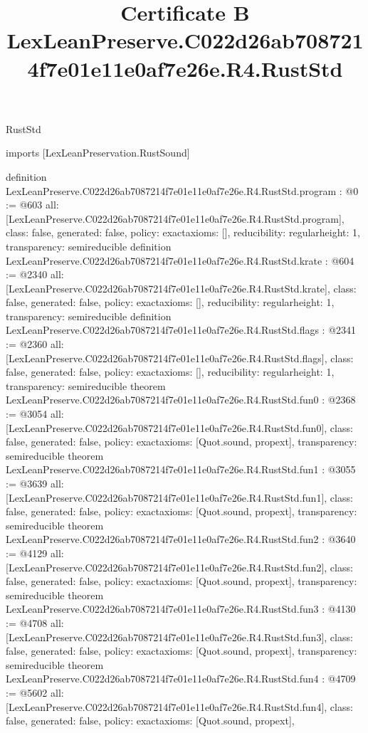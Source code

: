 \begin{lexlean}{RustStd}
\title{Certificate B LexLeanPreserve.C022d26ab7087214f7e01e11e0af7e26e.R4.RustStd}
\begin{coremodule}
imports [LexLeanPreservation.RustSound]

definition LexLeanPreserve.C022d26ab7087214f7e01e11e0af7e26e.R4.RustStd.program : @0 := @603 {
  all: [LexLeanPreserve.C022d26ab7087214f7e01e11e0af7e26e.R4.RustStd.program],
  class: false,
  generated: false,
  policy: exact{axioms: []},
  reducibility: regular{height: 1},
  transparency: semireducible
}
definition LexLeanPreserve.C022d26ab7087214f7e01e11e0af7e26e.R4.RustStd.krate : @604 := @2340 {
  all: [LexLeanPreserve.C022d26ab7087214f7e01e11e0af7e26e.R4.RustStd.krate],
  class: false,
  generated: false,
  policy: exact{axioms: []},
  reducibility: regular{height: 1},
  transparency: semireducible
}
definition LexLeanPreserve.C022d26ab7087214f7e01e11e0af7e26e.R4.RustStd.flags : @2341 := @2360 {
  all: [LexLeanPreserve.C022d26ab7087214f7e01e11e0af7e26e.R4.RustStd.flags],
  class: false,
  generated: false,
  policy: exact{axioms: []},
  reducibility: regular{height: 1},
  transparency: semireducible
}
theorem LexLeanPreserve.C022d26ab7087214f7e01e11e0af7e26e.R4.RustStd.fun0 : @2368 := @3054 {
  all: [LexLeanPreserve.C022d26ab7087214f7e01e11e0af7e26e.R4.RustStd.fun0],
  class: false,
  generated: false,
  policy: exact{axioms: [Quot.sound, propext]},
  transparency: semireducible
}
theorem LexLeanPreserve.C022d26ab7087214f7e01e11e0af7e26e.R4.RustStd.fun1 : @3055 := @3639 {
  all: [LexLeanPreserve.C022d26ab7087214f7e01e11e0af7e26e.R4.RustStd.fun1],
  class: false,
  generated: false,
  policy: exact{axioms: [Quot.sound, propext]},
  transparency: semireducible
}
theorem LexLeanPreserve.C022d26ab7087214f7e01e11e0af7e26e.R4.RustStd.fun2 : @3640 := @4129 {
  all: [LexLeanPreserve.C022d26ab7087214f7e01e11e0af7e26e.R4.RustStd.fun2],
  class: false,
  generated: false,
  policy: exact{axioms: [Quot.sound, propext]},
  transparency: semireducible
}
theorem LexLeanPreserve.C022d26ab7087214f7e01e11e0af7e26e.R4.RustStd.fun3 : @4130 := @4708 {
  all: [LexLeanPreserve.C022d26ab7087214f7e01e11e0af7e26e.R4.RustStd.fun3],
  class: false,
  generated: false,
  policy: exact{axioms: [Quot.sound, propext]},
  transparency: semireducible
}
theorem LexLeanPreserve.C022d26ab7087214f7e01e11e0af7e26e.R4.RustStd.fun4 : @4709 := @5602 {
  all: [LexLeanPreserve.C022d26ab7087214f7e01e11e0af7e26e.R4.RustStd.fun4],
  class: false,
  generated: false,
  policy: exact{axioms: [Quot.sound, propext]},
}
\end{coremodule}
\end{lexlean}
